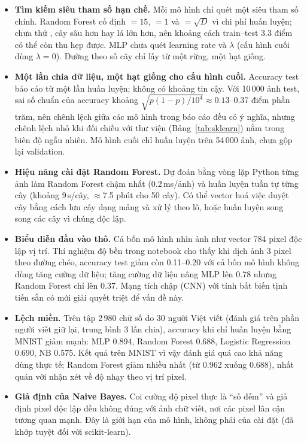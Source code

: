 \begin{itemize}
\item \textbf{Tìm kiếm siêu tham số hạn chế.} Mỗi mô hình chỉ quét một siêu tham số chính. Random Forest cố định $=15$, $=1$ và $=\sqrt D$ vì chi phí huấn luyện; chưa thử , cây sâu hơn hay lá lớn hơn, nên khoảng cách train--test 3.3 điểm có thể còn thu hẹp được. MLP chưa quét learning rate và $\lambda$ (cấu hình cuối dùng $\lambda=0$). Đường theo số cây chỉ lấy từ một rừng, một hạt giống.
\item \textbf{Một lần chia dữ liệu, một hạt giống cho cấu hình cuối.} Accuracy test báo cáo từ một lần huấn luyện; không có khoảng tin cậy. Với 10\,000 ảnh test, sai số chuẩn của accuracy khoảng $\sqrt{p(1-p)/10^4}\approx0.13$--0.37 điểm phần trăm, nên chênh lệch giữa các mô hình trong báo cáo đều có ý nghĩa, nhưng chênh lệch nhỏ khi đối chiếu với thư viện (Bảng~\ref{tab:sklearn}) nằm trong biên độ ngẫu nhiên. Mô hình cuối chỉ huấn luyện trên 54\,000 ảnh, chưa gộp lại validation.
\item \textbf{Hiệu năng cài đặt Random Forest.} Dự đoán bằng vòng lặp Python từng ảnh làm Random Forest chậm nhất (0.2\,ms/ảnh) và huấn luyện tuần tự từng cây (khoảng 9\,s/cây, $\approx$7.5 phút cho 50 cây). Có thể vector hoá việc duyệt cây bằng cách lưu cây dạng mảng và xử lý theo lô, hoặc huấn luyện song song các cây vì chúng độc lập.
\item \textbf{Biểu diễn đầu vào thô.} Cả bốn mô hình nhìn ảnh như vector 784 pixel độc lập vị trí. Thí nghiệm độ bền trong notebook cho thấy khi dịch ảnh 3 pixel theo đường chéo, accuracy test giảm còn 0.11--0.20 với cả bốn mô hình không dùng tăng cường dữ liệu; tăng cường dữ liệu nâng MLP lên 0.78 nhưng Random Forest chỉ lên 0.37. Mạng tích chập (CNN) với tính bất biến tịnh tiến sẵn có mới giải quyết triệt để vấn đề này.
\item \textbf{Lệch miền.} Trên tập 2\,980 chữ số do 30 người Việt viết (đánh giá trên phần người viết giữ lại, trung bình 3 lần chia), accuracy khi chỉ huấn luyện bằng MNIST giảm mạnh: MLP 0.894, Random Forest 0.688, Logistic Regression 0.690, NB 0.575. Kết quả trên MNIST vì vậy đánh giá quá cao khả năng dùng thực tế; Random Forest giảm nhiều nhất (từ 0.962 xuống 0.688), nhất quán với nhận xét về độ nhạy theo vị trí pixel.
\item \textbf{Giả định của Naive Bayes.} Coi cường độ pixel thực là ``số đếm'' và giả định pixel độc lập đều không đúng với ảnh chữ viết, nơi các pixel lân cận tương quan mạnh. Đây là giới hạn của mô hình, không phải của cài đặt (đã khớp tuyệt đối với scikit-learn).
\end{itemize}